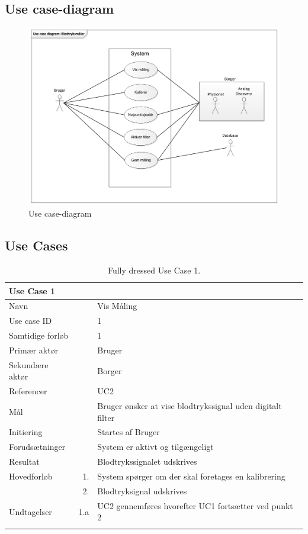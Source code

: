 \subsection{Use case-diagram}
\begin{figure}[H]
	\centering
	\includegraphics[width=1\textwidth]{Figurer/Snip20150929_8}
	\caption{Use case-diagram}
	\label{fig:Use case-diagram}
\end{figure}

\subsection{Use Cases}


\begin{longtabu} to  %
    {\large \textbf{Use Case 1}} && \\
    \toprule
    Navn &&    Vis Måling\\
    Use case ID &&    1\\
    Samtidige forløb &&    1\\
    Primær aktør &&    Bruger\\
    Sekundære aktør &&	 Borger\\
    Referencer &&    UC2 \\
    Mål &&    Bruger ønsker at vise blodtrykssignal uden digitalt filter\\
    Initiering &&	Startes af Bruger\\
    Forudsætninger &&  System er aktivt og tilgængeligt\\
    Resultat &&		Blodtrykssignalet udskrives                         \\ \midrule
    Hovedforløb &    1. &    System spørger om der skal foretages en kalibrering\\								
    			&    2. &    Blodtryksignal udskrives\newline\\ \midrule
                
    Undtagelser &    1.a &   UC2 gennemføres hvorefter UC1 fortsætter ved punkt 2   \\ \bottomrule
\caption{Fully dressed Use Case 1.}
\label{UC1}
\end{longtabu}


